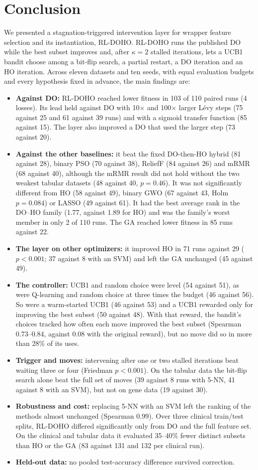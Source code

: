 \documentclass[journal]{IEEEtran}
\begin{document}
\section{Conclusion}
We presented a stagnation-triggered intervention layer for wrapper feature selection and its instantiation, RL-DOHO. RL-DOHO runs the published DO while the best subset improves and, after $\kappa=2$ stalled iterations, lets a UCB1 bandit choose among a bit-flip search, a partial restart, a DO iteration and an HO iteration. Across eleven datasets and ten seeds, with equal evaluation budgets and every hypothesis fixed in advance, the main findings are:
\begin{itemize}
\item \textbf{Against DO:} RL-DOHO reached lower fitness in 103 of 110 paired runs (4 losses). Its lead held against DO with 10$\times$ and 100$\times$ larger L\'evy steps (75 against 25 and 61 against 39 runs) and with a sigmoid transfer function (85 against 15). The layer also improved a DO that used the larger step (73 against 20).
\item \textbf{Against the other baselines:} it beat the fixed DO-then-HO hybrid (81 against 28), binary PSO (70 against 38), ReliefF (84 against 26) and mRMR (68 against 40), although the mRMR result did not hold without the two weakest tabular datasets (48 against 40, $p=0.46$). It was not significantly different from HO (58 against 49), binary GWO (67 against 43, Holm $p=0.084$) or LASSO (49 against 61). It had the best average rank in the DO--HO family (1.77, against 1.89 for HO) and was the family's worst member in only 2 of 110 runs. The GA reached lower fitness in 85 runs against 22.
\item \textbf{The layer on other optimizers:} it improved HO in 71 runs against 29 ($p<0.001$; 37 against 8 with an SVM) and left the GA unchanged (45 against 49).
\item \textbf{The controller:} UCB1 and random choice were level (54 against 51), as were Q-learning and random choice at three times the budget (46 against 56). So were a warm-started UCB1 (46 against 53) and a UCB1 rewarded only for improving the best subset (50 against 48). With that reward, the bandit's choices tracked how often each move improved the best subset (Spearman 0.73--0.84, against 0.08 with the original reward), but no move did so in more than 28\% of its uses.
\item \textbf{Trigger and moves:} intervening after one or two stalled iterations beat waiting three or four (Friedman $p<0.001$). On the tabular data the bit-flip search alone beat the full set of moves (39 against 8 runs with 5-NN, 41 against 8 with an SVM), but not on gene data (19 against 30).
\item \textbf{Robustness and cost:} replacing 5-NN with an SVM left the ranking of the methods almost unchanged (Spearman 0.99). Over three clinical train/test splits, RL-DOHO differed significantly only from DO and the full feature set. On the clinical and tabular data it evaluated 35--40\% fewer distinct subsets than HO or the GA (83 against 131 and 132 per clinical run).
\item \textbf{Held-out data:} no pooled test-accuracy difference survived correction.
\end{itemize}
\end{document}
